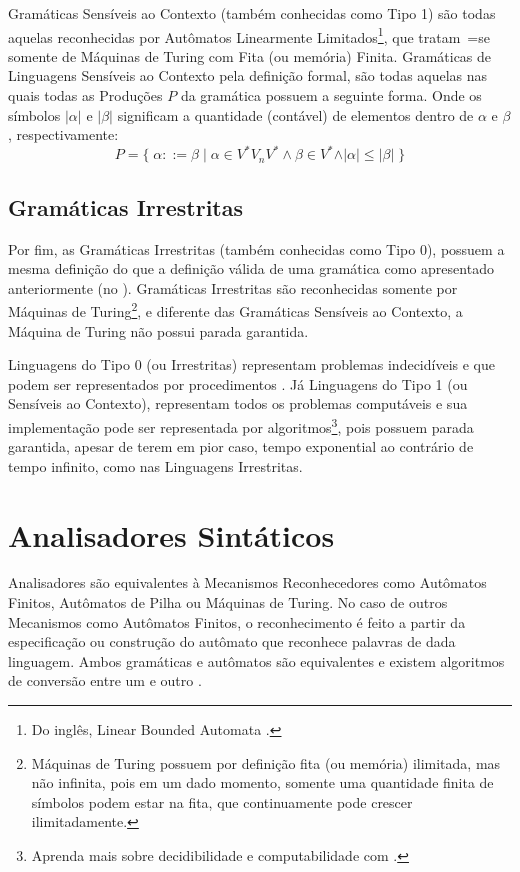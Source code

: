 Gramáticas Sensíveis ao Contexto (também conhecidas como Tipo 1) são todas aquelas reconhecidas por Autômatos Linearmente Limitados\footnote{
Do inglês,
Linear Bounded Automata \cite{fundamentalsOfTheoreticalComputerScience}.
},
que tratam~=se somente de Máquinas de Turing \cite{sipserBook} com Fita (ou memória) Finita.
Gramáticas de Linguagens Sensíveis ao Contexto pela definição formal,
são todas aquelas nas quais todas as Produções $P$ da gramática possuem a seguinte forma.
Onde os símbolos $\vert\alpha\vert$ e
$\vert\beta\vert$ significam a quantidade (contável) de elementos dentro de $\alpha$ e
$\beta$,
respectivamente:
$$ P = \{\; \alpha ::= \beta \;|\; \alpha \in V^* V_n V^* \land \beta \in V^*
            \land \vert\alpha\vert \leq \vert\beta\vert \;\} $$


\subsection{Gramáticas Irrestritas}

Por fim,
as Gramáticas Irrestritas (também conhecidas como Tipo 0),
possuem a mesma definição do que a definição válida de uma gramática como apresentado anteriormente (no
).
Gramáticas Irrestritas são reconhecidas somente por Máquinas de Turing\footnote{
Máquinas de Turing possuem por definição fita (ou memória) ilimitada,
mas não infinita,
pois em um dado momento,
somente uma quantidade finita de símbolos podem estar na fita,
que continuamente pode crescer ilimitadamente.
},
e diferente das Gramáticas Sensíveis ao Contexto,
a Máquina de Turing não possui parada garantida.

Linguagens do Tipo 0 (ou Irrestritas) representam problemas indecidíveis e
que podem ser representados por procedimentos \cite{sipserBook}.
Já Linguagens do Tipo 1 (ou Sensíveis ao Contexto),
representam todos os problemas computáveis e
sua implementação pode ser representada por algoritmos\footnote{
Aprenda mais sobre decidibilidade e
computabilidade com .
},
pois possuem parada garantida,
apesar de terem em pior caso,
tempo exponential ao contrário de tempo infinito,
como nas Linguagens Irrestritas.


\section{Analisadores Sintáticos}
\label{analisadoresSintaticos}

Analisadores são equivalentes à Mecanismos Reconhecedores como Autômatos Finitos,
Autômatos de Pilha ou
Máquinas de Turing.
No caso de outros Mecanismos como Autômatos Finitos,
o reconhecimento é feito a partir da especificação ou
construção do autômato que reconhece palavras de dada linguagem.
Ambos gramáticas e
autômatos são equivalentes e
existem algoritmos de conversão entre um e
outro \cite{hopcroftBook}.

